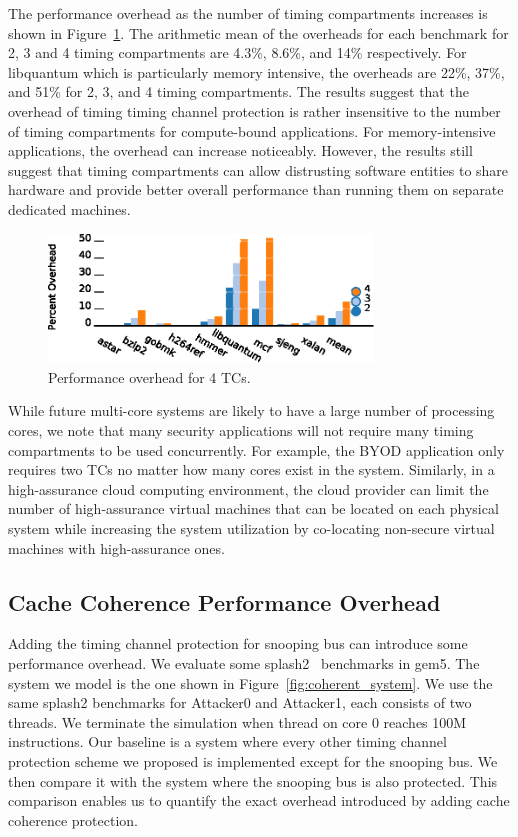The performance overhead as the number of timing compartments increases is 
shown in Figure~\ref{fig:scalability}. The arithmetic mean of the overheads for 
each benchmark for 2, 3 and 4 timing compartments are 4.3\%, 8.6\%, and 14\% 
respectively. For libquantum which is particularly memory intensive, the 
overheads are 22\%, 37\%, and 51\% for 2, 3, and 4 timing compartments. The 
results suggest that the overhead of timing timing channel protection is rather 
insensitive to the number of timing compartments for compute-bound 
applications. For memory-intensive applications, the overhead can increase 
noticeably. However, the results still suggest that timing compartments can 
allow distrusting software entities to share hardware and provide better 
overall performance than running them on separate dedicated machines.

\begin{figure}
    \begin{center}
        \includegraphics[width=3.4in]{figs/scalability.eps}
        \caption{Performance overhead for 4 TCs.}
        \label{fig:scalability}
    \end{center}
\end{figure}

While future multi-core systems are likely to have a large number of processing 
cores, we note that many security applications will not require many timing 
compartments to be used concurrently. For example, the BYOD application only 
requires two TCs no matter how many cores exist in the system. Similarly, in a 
high-assurance cloud computing environment, the cloud provider can limit the
number of high-assurance virtual machines that can be located on each physical
system while increasing the system utilization by co-locating non-secure
virtual machines with high-assurance ones.

\subsection{Cache Coherence Performance Overhead}
Adding the timing channel protection for snooping bus can introduce some 
performance overhead. We evaluate some splash2~\cite{splash2} benchmarks in 
gem5. The system we model is the one shown in Figure~\ref{fig:coherent_system}.
We use the same splash2 benchmarks for Attacker0 and Attacker1, each consists 
of two threads. We terminate the simulation
when thread on core 0 reaches 100M instructions.  Our baseline is a system 
where every other timing channel protection scheme we proposed is implemented 
except for the snooping bus.
We then compare it with the system where the snooping bus is also protected. 
This comparison enables us to quantify the exact overhead introduced by adding 
cache coherence protection. 

